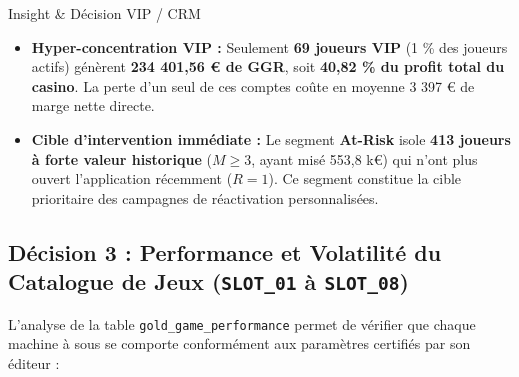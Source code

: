 \documentclass[11pt,a4paper]{article}
\begin{document}
\begin{table}[h!]
\centering
{}
\caption{Répartition financière par segment RFM dans \texttt{gold\_player\_360}.}
\end{table}

\begin{execbox}{Insight \& Décision VIP / CRM}
\begin{itemize}
    \item \textbf{Hyper-concentration VIP :} Seulement \textbf{69 joueurs VIP} (1 \% des joueurs actifs) génèrent \textbf{234 401,56 \euro{} de GGR}, soit \textbf{40,82 \% du profit total du casino}. La perte d'un seul de ces comptes coûte en moyenne 3 397 \euro{} de marge nette directe.
    \item \textbf{Cible d'intervention immédiate :} Le segment \textbf{At-Risk} isole \textbf{413 joueurs à forte valeur historique} ($M \ge 3$, ayant misé 553,8 k\euro) qui n'ont plus ouvert l'application récemment ($R=1$). Ce segment constitue la cible prioritaire des campagnes de réactivation personnalisées.
\end{itemize}
\end{execbox}

\subsection{Décision 3 : Performance et Volatilité du Catalogue de Jeux (\texttt{SLOT\_01} à \texttt{SLOT\_08})}
L'analyse de la table \texttt{gold\_game\_performance} permet de vérifier que chaque machine à sous se comporte conformément aux paramètres certifiés par son éditeur :
\end{document}
